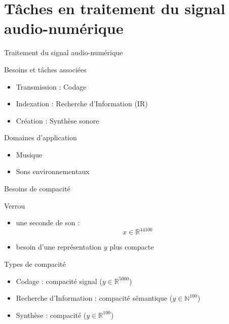 
\section[Tâches]{Tâches en traitement du signal audio-numérique}


\begin{frame}{Traitement du signal audio-numérique}
\begin{block}{Besoins et tâches associées}
\begin{itemize}
\item Transmission : Codage
\item Indexation : Recherche d'Information (IR)
\item Création : Synthèse sonore
\end{itemize}
\end{block}
\begin{block}{Domaines d'application}
\begin{itemize}
\item Musique
\item Sons environnementaux
\end{itemize}
\end{block}
\end{frame}


\begin{frame}{Besoins de compacité}
\begin{block}{Verrou}
\begin{itemize}
\item une seconde de son : $$ x \in \mathbb{R}^{44100}$$
\item besoin d'une représentation $y$ plus compacte
\end{itemize}
\end{block}
\begin{block}{Types de compacité}
\begin{itemize}
\item Codage : compacité signal ($ y \in \mathbb{R}^{5000}$)
\item Recherche d'Information : compacité sémantique ($ y \in \mathbb{N}^{100}$)
\item Synthèse : compacité \alert{\og}  \alert{\fg} ($ y \in \mathbb{R}^{100}$)
\end{itemize}
\end{block}
\end{frame}